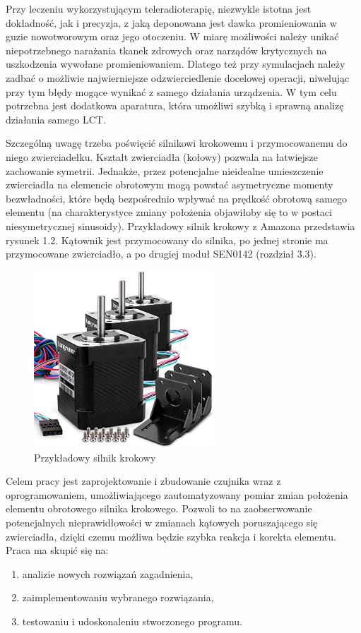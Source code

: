 Przy leczeniu wykorzystującym teleradioterapię, niezwykle istotna jest dokładność, jak i precyzja, z jaką deponowana jest dawka promieniowania w guzie nowotworowym oraz jego otoczeniu. W miarę możliwości należy unikać niepotrzebnego narażania tkanek zdrowych oraz narządów krytycznych na uszkodzenia wywołane promieniowaniem. Dlatego też przy symulacjach należy zadbać o możliwie najwierniejsze odzwierciedlenie docelowej operacji, niwelując przy tym błędy mogące wynikać z samego działania urządzenia. W tym celu potrzebna jest dodatkowa aparatura, która umożliwi szybką i sprawną analizę działania samego LCT.

\newpage

Szczególną uwagę trzeba poświęcić silnikowi krokowemu i przymocowanemu do niego zwierciadełku. Kształt zwierciadła (kołowy) pozwala na łatwiejsze zachowanie symetrii. Jednakże, przez potencjalne nieidealne umieszczenie zwierciadła na elemencie obrotowym mogą powstać asymetryczne momenty bezwładności, które będą bezpośrednio wpływać na prędkość obrotową samego elementu (na charakterystyce zmiany położenia objawiłoby się to w postaci niesymetrycznej sinusoidy). Przykładowy silnik krokowy z Amazona przedstawia rysunek 1.2. Kątownik jest przymocowany do silnika, po jednej stronie ma przymocowane zwierciadło, a po drugiej moduł SEN0142 (rozdział 3.3).

\begin{figure}[H]
    \centering
    \includegraphics[width=0.6\textwidth]{pictures/silnik.jpg}
    \caption{Przykładowy silnik krokowy}
    \label{fig:silnik}
\end{figure}

Celem pracy jest zaprojektowanie i zbudowanie czujnika wraz z oprogramowaniem, umożliwiającego zautomatyzowany pomiar zmian położenia elementu obrotowego silnika krokowego. Pozwoli to na zaobserwowanie potencjalnych nieprawidłowości w zmianach kątowych poruszającego się zwierciadła, dzięki czemu możliwa będzie szybka reakcja i korekta elementu. Praca ma skupić się na:

\begin{enumerate}
    \item analizie nowych rozwiązań zagadnienia,
    \item zaimplementowaniu wybranego rozwiązania,
    \item testowaniu i udoskonaleniu stworzonego programu.
\end{enumerate}